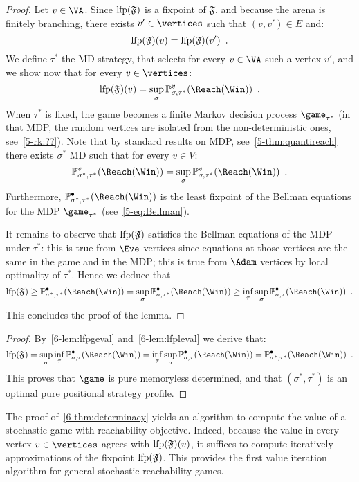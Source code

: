   \begin{proof}
    Let $v \in \VA$. Since $\textrm{lfp}(\mathfrak{F})$ is a fixpoint of
    $\mathfrak{F}$, and because the arena is finitely branching, there exists $v'\in \vertices$ such
    that $(v,v') \in E$ and:
    \[
      \textrm{lfp}(\mathfrak{F})(v) = \textrm{lfp}(\mathfrak{F})(v') \enspace.
    \]
    We define $\tau^*$ the MD strategy, that selects for every
    $v\in \VA$ such a vertex $v'$, and we show now that for every
    $v \in \vertices$:
    \[
    \lfp(\mathfrak{F})(v) = \sup_\sigma
    \probm_{\sigma,\tau^*}^v(\Reach(\Win)) \enspace.
    \]
    When $\tau^*$ is fixed, the game becomes a finite Markov decision
    process $\game_{\tau^*}$ (in that MDP, the random vertices are
    isolated from the non-deterministic ones, see~\cref{5-rk:??}). 
    Note that by standard results on MDP,
    see~\cref{5-thm:quantireach} there exists $\sigma^*$ MD such that
    for every $v \in V$:
    \[
    \probm_{\sigma^*,\tau^*}^v(\Reach(\Win)) = \sup_\sigma
    \probm_{\sigma,\tau^*}^v(\Reach(\Win)) \enspace.
    \]
    Furthermore, $\probm_{\sigma^*,\tau^*}^\bullet(\Reach(\Win))$ is
    the least fixpoint of the Bellman equations for the MDP
    $\game_{\tau^*}$ (see~\cref{5-eq:Bellman}).
    
    It remains to observe that $\textrm{lfp}(\mathfrak{F})$ satisfies the
    Bellman equations of the MDP under $\tau^*$: this is true from
    $\Eve$ vertices since equations at those vertices are the same in
    the game and in the MDP; this is true from $\Adam$ vertices by local
    optimality of $\tau^*$. Hence we deduce that
    \[
      \lfp(\mathfrak{F}) \ge
      \probm_{\sigma^*,\tau^*}^\bullet(\Reach(\Win)) = \sup_\sigma
      \probm_{\sigma,\tau^*}^\bullet(\Reach(\Win)) \ge \inf_\tau
      \sup_\sigma \probm_{\sigma,\tau}^\bullet(\Reach(\Win)) \enspace.
    \]
    This concludes the proof of the lemma. 
  \end{proof}
  
\begin{proof}
By~\cref{6-lem:lfpgeval} and~\cref{6-lem:lfpleval}  we derive that:
 \[
   \lfp(\mathfrak{F}) =
   \sup_\sigma \inf_\tau 
    \probm_{\sigma,\tau}^\bullet(\Reach(\Win)) =  \inf_\tau \sup_\sigma
   \probm_{\sigma,\tau}^\bullet(\Reach(\Win)) = 
   \probm_{\sigma^*,\tau^*}^\bullet(\Reach(\Win)) \enspace.
  \]
  This proves that $\game$ is pure memoryless determined, and that
  $(\sigma^*,\tau^*)$ is an optimal pure positional strategy profile.
\end{proof}

The proof of~\cref{6-thm:determinacy} yields an algorithm to
compute the value of a stochastic game with reachability
objective. Indeed, because the value in every vertex $v \in \vertices$
agrees with $\textrm{lfp}(\mathfrak{F})(v)$, it suffices to compute
iteratively approximations of the fixpoint $\textrm{lfp}(\mathfrak{F})$.  This
provides the first value iteration algorithm for general stochastic
reachability games.

